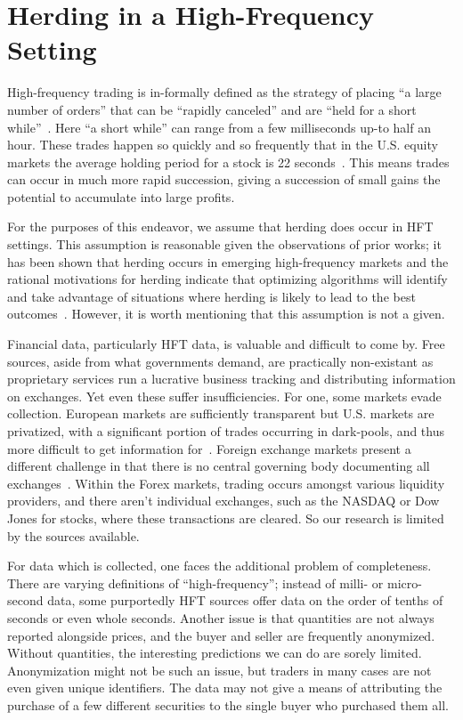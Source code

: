 \section{Herding in a High-Frequency Setting}
\label{observations}
High-frequency trading is in-formally defined as the strategy of placing ``a large number of orders'' that can be ``rapidly canceled'' and are ``held for a short while''~\cite[2]{ahlstedt2012high}.
Here ``a short while'' can range from a few milliseconds up-to half an hour.
These trades happen so quickly and so frequently that in the U.S. equity markets the average holding period for a stock is 22 seconds~\cite[2]{ahlstedt2012high}.
This means trades can occur in much more rapid succession, giving a succession of small gains the potential to accumulate into large profits.

For the purposes of this endeavor, we assume that herding does occur in HFT settings. 
This assumption is reasonable given the observations of prior works; it has been shown that herding occurs in emerging high-frequency markets and the rational motivations for herding indicate that optimizing algorithms will identify and take advantage of situations where herding is likely to lead to the best outcomes~\cite{lin,boortz,bikhchandani}.
However, it is worth mentioning that this assumption is not a given.

Financial data, particularly HFT data, is valuable and difficult to come by.
Free sources, aside from what governments demand, are practically non-existant as proprietary services run a lucrative business tracking and distributing information on exchanges.
Yet even these suffer insufficiencies.
For one, some markets evade collection.
European markets are sufficiently transparent but U.S. markets are privatized, with a significant portion of trades occurring in dark-pools, and thus more difficult to get information for~\cite{beny2005insider}.
Foreign exchange markets present a different challenge in that there is no central governing body documenting all exchanges~\cite{sarno2001official}.
Within the Forex markets, trading occurs amongst various liquidity providers, and there aren't individual exchanges, such as the NASDAQ or Dow Jones for stocks, where these transactions are cleared.
So our research is limited by the sources available.

For data which is collected, one faces the additional problem of completeness. 
There are varying definitions of ``high-frequency''; instead of milli- or micro- second data, some purportedly HFT sources offer data on the order of tenths of seconds or even whole seconds.
Another issue is that quantities are not always reported alongside prices, and the buyer and seller are frequently anonymized.
Without quantities, the interesting predictions we can do are sorely limited.
Anonymization might not be such an issue, but traders in many cases are not even given unique identifiers.
The data may not give a means of attributing the purchase of a few different securities to the single buyer who purchased them all.

